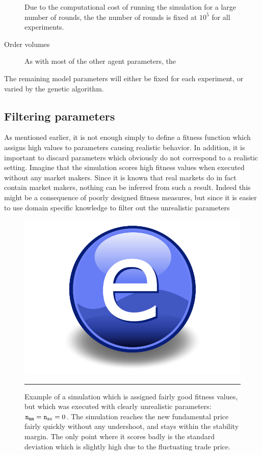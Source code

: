\begin{description}
	\item [\nrounds] Due to the computational cost of running the simulation for a large number of rounds, the the number of rounds is fixed at $10^5$ for all experiments.
	\item [Order volumes] As with most of the other agent parameters, the 
\end{description}

The remaining model parameters will either be fixed for each experiment, or varied by the genetic algorithm. 

\subsection{Filtering parameters}\label{section:filtering_parameters}
As mentioned earlier, it is not enough simply to define a fitness function which assigns high values to parameters causing realistic behavior. In addition, it is important to discard parameters which obviously do not correspond to a realistic setting. Imagine that the simulation scores high fitness values when executed without any market makers. Since it is known that real markets do in fact contain market makers, nothing can be inferred from such a result. Indeed this might be a consequence of poorly designed fitness measures, but since it is easier to use domain specific knowledge to filter out the unrealistic parameters

\begin{figure}[htbp]
	\centering
		\includegraphics{Figures/Electron.pdf}
		\rule{35em}{0.5pt}
	\caption{Example of a simulation which is assigned fairly good fitness values, but which was executed with clearly unrealistic parameters: $ \texttt{n}_\texttt{mm}  =  \texttt{n}_\texttt{sc}  = 0$. The simulation reaches the new fundamental price fairly quickly without any undershoot, and stays within the stability margin. The only point where it scores badly is the standard deviation which is slightly high due to the fluctuating trade price.}
	\label{fig:no_marketmakers}
\end{figure}



